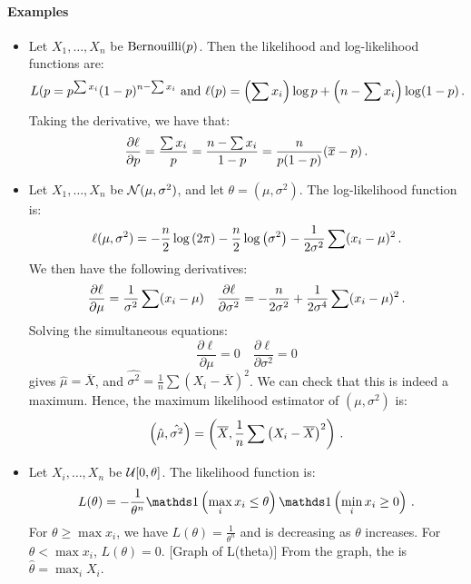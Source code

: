 \paragraph{Examples}
\begin{itemize}
\item Let $X_1, \dotsc, X_n$ be \iid $\text{Bernouilli}(p)$. Then the likelihood and log-likelihood functions are:
\[
L(p = p^{\sum x_i}(1-p)^{n - \sum x_i} \text{ and } 
\ell(p) = \left(\sum x_i\right)\log p + \left(n - \sum x_i\right)\log (1 - p) \, {.}
\]
Taking the derivative, we have that:
\[
\frac{\partial \ell}{\partial p} = \frac{\sum x_i}{p} = \frac{n - \sum x_i}{1-p} = \frac{n}{p(1-p)}(\overline{x} - p) \, {.}
\]

\item Let $X_1, \dotsc, X_n$ be \iid $\mathcal{N}(\mu, \sigma^2)$, and let $\theta = (\mu, \sigma^2)$. The log-likelihood function is:
\[
\ell (\mu, \sigma^2) = -\frac{n}{2}\log \left(2\pi\right) - \frac{n}{2}\log \left(\sigma^2\right) - \frac{1}{2\sigma^2}\sum (x_i - \mu)^2 \, {.}
\]
We then have the following derivatives:
\[
\frac{\partial \ell}{\partial \mu} = \frac{1}{\sigma^2}\sum(x_i - \mu) \quad \frac{\partial \ell}{\partial \sigma^2} = -\frac{n}{2\sigma^2} + \frac{1}{2\sigma^4}\sum (x_i - \mu)^2 \, {.}
\]
Solving the simultaneous equations:
\[
\frac{\partial \ell}{\partial \mu} = 0 \quad \frac{\partial \ell}{\partial \sigma^2} = 0
\]
gives $\hat{\mu} = \overline{X}$, and $\hat{\sigma^2} = \frac{1}{n}\sum\left(X_i - \overline{X}\right)^2$. We can check that this is indeed a maximum. 
Hence, the maximum likelihood estimator of $(\mu, \sigma^2)$ is:
\[
\left(\hat{\mu}, \hat{\sigma^2}\right) = \left(\overline{X}, \frac{1}{n}\sum\left(X_i - \overline{X}\right)^2\right) \, {.}
\]

\item Let $X_i, \dotsc, X_n$ be \iid $\mathcal{U}[0, \theta]$. The likelihood function is:
\[
L(\theta) = -\frac{1}{\theta^n}\indicator{\max_i x_i \leq \theta}\indicator{\min_i x_i \geq 0} \mpunct{.}
\]
For $\theta \geq \max x_i$, we have $L(\theta) = \frac{1}{\theta^n}$ and is decreasing as $\theta$ increases. For $\theta < \max x_i$, $L(\theta) = 0$.
[Graph of L(theta)]
From the graph, the \mle is $\hat{\theta} = \max_i X_i$.


\end{itemize}
